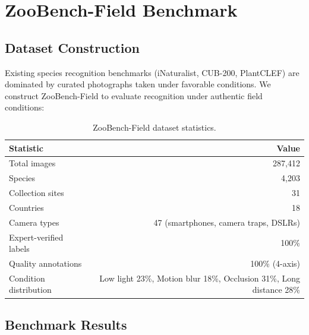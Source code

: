 \section{ZooBench-Field Benchmark}

\label{sec:benchmark}

\subsection{Dataset Construction}

Existing species recognition benchmarks (iNaturalist, CUB-200, PlantCLEF) are dominated by curated photographs taken under favorable conditions.
We construct ZooBench-Field to evaluate recognition under authentic field conditions:

\begin{table}[H]
\centering
\caption{ZooBench-Field dataset statistics.}
\label{tab:zoobench}
\begin{tabular}{@{}lr@{}}
\toprule
\textbf{Statistic} & \textbf{Value} \\
\midrule
Total images & 287,412 \\
Species & 4,203 \\
Collection sites & 31 \\
Countries & 18 \\
Camera types & 47 (smartphones, camera traps, DSLRs) \\
Expert-verified labels & 100\% \\
Quality annotations & 100\% (4-axis) \\
Condition distribution & Low light 23\%, Motion blur 18\%, Occlusion 31\%, Long distance 28\% \\
\bottomrule
\end{tabular}
\end{table}

\subsection{Benchmark Results}

